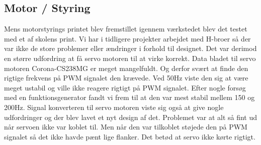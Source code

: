 \subsection{Motor / Styring}
Mens motorstyrings printet blev fremstillet igennem værkstedet blev det testet med et af skolens print. Vi har i tidligere projekter arbejdet med H-broer så der var ikke de store problemer eller ændringer i forhold til designet.\newline
Det var derimod en større udfordring at få servo motoren til at virke korrekt.  
Data bladet til servo motoren Corona-CS238MG \cite{lib:Corona-CS238MG} er meget mangelfuldt. Og derfor svært at finde den rigtige frekvens på PWM signalet den krævede. 
Ved 50Hz viste den sig at være meget ustabil og ville ikke reagere rigtigt på PWM signalet. Efter nogle forsøg med en funktionsgenerator fandt vi frem til at den var mest stabil mellem 150 og 200Hz. 
Signal konverteren til servo motoren viste sig også at give nogle udfordringer og der blev lavet et nyt design af det. Problemet var at alt så fint ud når servoen ikke var koblet til. Men når den var tilkoblet støjede den på PWM signalet så det ikke havde pænt lige flanker. Det betød at servo ikke kørte rigtigt.